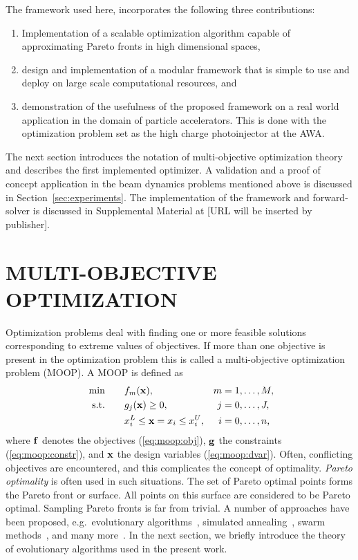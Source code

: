 \documentclass[preprint,linenumbers,amsmath,amssymb,aps,prstab]{revtex4-1}%
\begin{document}
The framework used here, incorporates the following three contributions:
%
\begin{enumerate}
  \item Implementation of a scalable optimization algorithm capable of
        approximating Pareto fronts in high dimensional spaces,
  \item design and implementation of a modular framework that is simple to use
        and deploy on large scale computational resources, and
  \item demonstration of the usefulness of the proposed framework on a real world
        application in the domain of particle accelerators. This is done
        with the optimization problem set as 
        the high charge photoinjector at the AWA. 
\end{enumerate}

The next section introduces the notation of multi-objective optimization
theory and describes the first implemented optimizer.
A validation and a proof of concept application in the beam dynamics problems 
mentioned above is discussed in Section~\ref{sec:experiments}.
The implementation of the framework and forward-solver is 
discussed in Supplemental Material at [URL will be inserted by publisher].


\section{MULTI-OBJECTIVE OPTIMIZATION} \label{sec:optimization}

Optimization problems deal with finding one or more feasible solutions
  corresponding to extreme values of objectives.
If more than one objective is present in the optimization problem this is called
  a multi-objective optimization problem (MOOP).
A MOOP is defined as
%
\begin{align}
  \text{ min} \quad & \quad f_m({\bf x}), ~& m &= 1, \dots, M, \label{eq:moop:obj}\\
  \text{s.t.} \quad & \quad g_j({\bf x}) \geq 0, & j &= 0, \dots, J,
  \label{eq:moop:constr}\\
  \quad & \quad  x_i^L \leq {\bf x}=x_i \leq x_i^U,& i &=0, \dots, n
  \label{eq:moop:dvar} \text{,}
\end{align}
%
where $\bf f$ denotes the objectives (\ref{eq:moop:obj}),
  $\bf g$ the constraints (\ref{eq:moop:constr}),
  and $\bf x$ the design variables (\ref{eq:moop:dvar}).
Often, conflicting objectives are encountered, and this complicates the concept of
  optimality. \textit{Pareto optimality} is often used in such situations.
The set of Pareto optimal points forms the Pareto front or
  surface.
All points on this surface are considered to be Pareto optimal.
Sampling Pareto fronts is far from trivial.
A number of approaches have been proposed,
  e.g.\ evolutionary algorithms~\cite{deb:09},
  simulated annealing~\cite{kigv:83},
  swarm methods~\cite{keeb:95},
  and many more~\cite{domc:96,cati:02,kara:05,hoss:09}.
In the next section, we briefly introduce the theory of evolutionary algorithms
  used in the present work.
\end{document}

